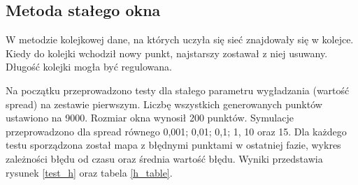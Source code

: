 \documentclass[10pt,a4paper]{article}
\begin{document}
\subsection{Metoda stałego okna}
W metodzie kolejkowej dane, na których uczyła się sieć znajdowały się w kolejce. Kiedy do kolejki wchodził nowy punkt, najstarszy zostawał z niej usuwany. Długość kolejki mogła być regulowana. 

Na początku przeprowadzono testy dla stałego parametru wygładzania (wartość spread) na zestawie pierwszym. Liczbę wszystkich generowanych punktów ustawiono na 9000. Rozmiar okna wynosił 200 punktów. Symulacje przeprowadzono dla spread równego 0,001; 0,01; 0,1; 1, 10 oraz 15. Dla każdego testu sporządzona został mapa z błędnymi punktami w ostatniej fazie, wykres zależności błędu od czasu oraz średnia wartość błędu. Wyniki przedstawia rysunek \ref{test_h} oraz tabela \ref{h_table}.
\end{document}
